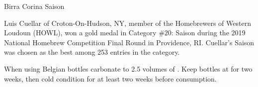 \stylesection{\stylesaison}

\begin{recipie}{Birra Corina Saison}

\begin{aboutblock}
Luis Cuellar of Croton-On-Hudson, NY, member of the Homebrewers of Western
Loudoun (HOWL), won a gold medal in Category \#20: Saison during the 2019
National Homebrew Competition Final Round in Providence, RI. Cuellar's Saison
was chosen as the best among 253 entries in the category. \sourceaha
\end{aboutblock}


\begin{methodandtiming}
 
\begin{mashsteps}
\end{mashsteps}

\begin{fermentationsteps}
\end{fermentationsteps}

\begin{directions}
When using Belgian bottles carbonate to 2.5 volumes of . Keep bottles
at  for two weeks, then cold condition for at least two weeks before
consumption.
\end{directions}

\end{methodandtiming}

\pagebreak

\begin{ingredientsblock}

\begin{malts}
\end{malts}

\begin{hops}
\end{hops}


\end{ingredientsblock}

\end{recipie}

